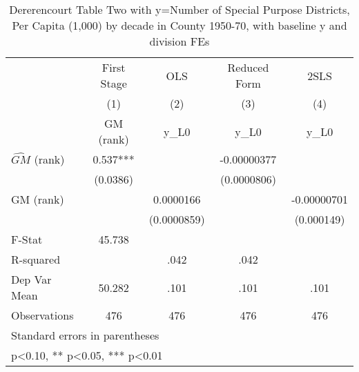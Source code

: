 \begin{table}[htbp]\centering
\def\sym#1{\ifmmode^{#1}\else\(^{#1}\)\fi}
\caption{Dererencourt Table Two with y=Number of Special Purpose Districts, Per Capita (1,000) by decade in County 1950-70, with baseline y and division FEs}
\begin{tabular}{l*{4}{c}}
\toprule
                    & First Stage   &         OLS   &Reduced Form   &        2SLS   \\
                    &\multicolumn{1}{c}{(1)}&\multicolumn{1}{c}{(2)}&\multicolumn{1}{c}{(3)}&\multicolumn{1}{c}{(4)}\\
                    &\multicolumn{1}{c}{GM  (rank)}&\multicolumn{1}{c}{y\_L0}&\multicolumn{1}{c}{y\_L0}&\multicolumn{1}{c}{y\_L0}\\
\midrule
$\hat{GM}$ (rank)   &       0.537***&               & -0.00000377   &               \\
                    &    (0.0386)   &               & (0.0000806)   &               \\
\addlinespace
GM  (rank)          &               &   0.0000166   &               & -0.00000701   \\
                    &               & (0.0000859)   &               &  (0.000149)   \\
\midrule
F-Stat              &      45.738   &               &               &               \\
R-squared           &               &        .042   &        .042   &               \\
Dep Var Mean        &      50.282   &        .101   &        .101   &        .101   \\
Observations        &         476   &         476   &         476   &         476   \\
\bottomrule
\multicolumn{5}{l}{\footnotesize Standard errors in parentheses}\\
\multicolumn{5}{l}{\footnotesize * p<0.10, ** p<0.05, *** p<0.01}\\
\end{tabular}
\end{table}
